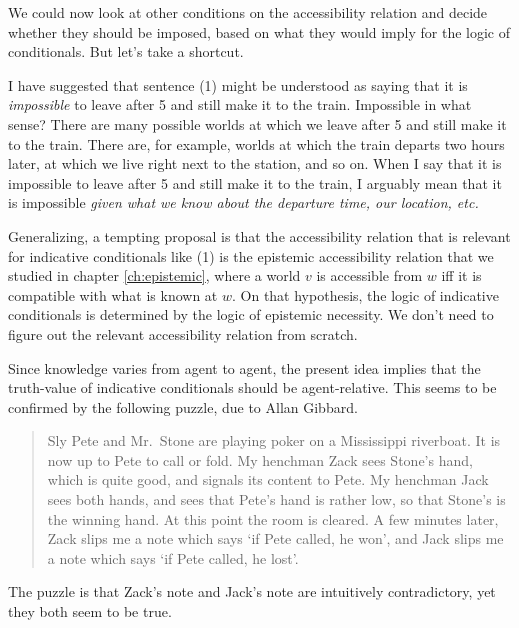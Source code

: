 
We could now look at other conditions on the accessibility relation and decide
whether they should be imposed, based on what they would imply for the logic of
conditionals. But let's take a shortcut.

I have suggested that sentence (1) might be understood as saying that it is
\emph{impossible} to leave after 5 and still make it to the train. Impossible in
what sense? There are many possible worlds at which we leave after 5 and still
make it to the train. There are, for example, worlds at which the train departs
two hours later, at which we live right next to the station, and so on. When I
say that it is impossible to leave after 5 and still make it to the train, I
arguably mean that it is impossible \emph{given what we know about the departure
  time, our location, etc.}

Generalizing, a tempting proposal is that the accessibility relation that is
relevant for indicative conditionals like (1) is the epistemic accessibility
relation that we studied in chapter \ref{ch:epistemic}, where a world $v$ is
accessible from $w$ iff it is compatible with what is known at $w$. On that
hypothesis, the logic of indicative conditionals is determined by the logic
of epistemic necessity. We don't need to figure out the relevant accessibility
relation from scratch.

Since knowledge varies from agent to agent, the present idea implies that the
truth-value of indicative conditionals should be agent-relative. This seems to
be confirmed by the following puzzle, due to Allan Gibbard.
\begin{quote}
  Sly Pete and Mr.\ Stone are playing poker on a Mississippi riverboat. It is
  now up to Pete to call or fold. My henchman Zack sees Stone’s hand, which is
  quite good, and signals its content to Pete. My henchman Jack sees both hands,
  and sees that Pete's hand is rather low, so that Stone's is the winning hand.
  At this point the room is cleared. A few minutes later, Zack slips me a note
  which says `if Pete called, he won', and Jack slips me a note which says `if
  Pete called, he lost'. %
\end{quote}
The puzzle is that Zack's note and Jack's note are intuitively contradictory,
yet they both seem to be true.

